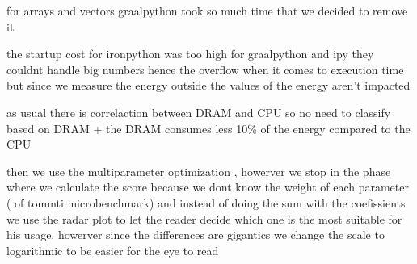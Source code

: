
for arrays and vectors  graalpython took so much time that we decided to remove it

the startup cost for ironpython was too high
for graalpython and ipy they couldnt handle big numbers hence the overflow  when it comes to execution time
but since we measure the energy outside the values of the energy aren't impacted

as usual there is  correlaction between DRAM and CPU so no need to classify based on DRAM + the DRAM consumes less 10\% of the  energy compared to the CPU

then we use the multiparameter optimization , howerver we stop in the phase where we calculate the score
because we dont know the weight of each parameter ( of tommti microbenchmark) and instead of doing the sum with the coefissients we use the radar plot to let the reader decide which one is the most suitable for his usage. howerver since the differences are gigantics we change the scale to logarithmic to be easier for the eye to read





